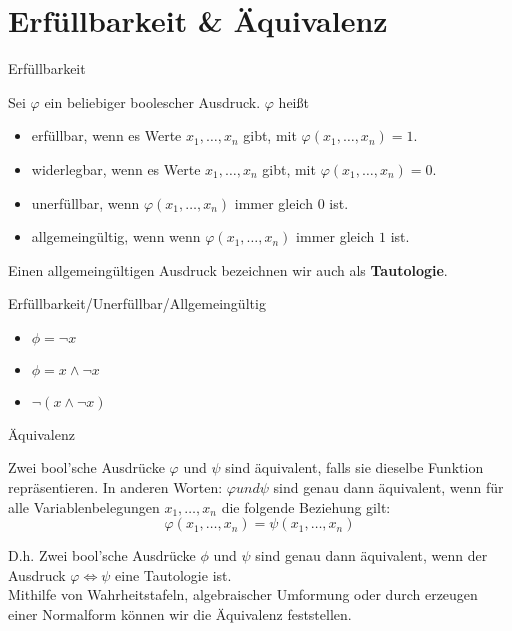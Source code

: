 \documentclass[12pt%
,aspectratio=169%
]{beamer}
\begin{document}
\section{Erfüllbarkeit \& Äquivalenz}
\begin{frame}{Erfüllbarkeit}
	\begin{definition}[Erfüllbarkeit]
		Sei $\varphi$ ein beliebiger boolescher Ausdruck. $\varphi$ heißt
		\begin{itemize}
			\item erfüllbar, wenn es Werte $x_1, \ldots, x_n$ gibt, mit $\varphi (x_1, \ldots, x_n ) = 1$.
			\item widerlegbar, wenn es Werte $x_1, \ldots, x_n$ gibt, mit $\varphi (x_1, \ldots, x_n) = 0$.
			\item unerfüllbar, wenn $\varphi (x_1 ,\ldots , x_n )$ immer gleich $0$ ist.
			\item allgemeingültig, wenn wenn $\varphi (x_1 ,\ldots , x_n )$ immer gleich $1$ ist.
		\end{itemize}
		Einen allgemeingültigen Ausdruck bezeichnen wir auch als \textbf{Tautologie}.
	\end{definition}
\end{frame}

\begin{frame}{Erfüllbarkeit/Unerfüllbar/Allgemeingültig}
\begin{itemize}
	\item $\phi = \neg x$
	\item $\phi = x \land \neg x$
	\item $\neg (x \land \neg x)$
\end{itemize}
\end{frame}

\begin{frame}{Äquivalenz}
\begin{definition}[Äquivalenz]
Zwei bool'sche Ausdrücke $\varphi$ und $\psi$ sind äquivalent, falls sie dieselbe Funktion repräsentieren. In anderen Worten: $\varphi und \psi$ sind genau dann äquivalent, wenn für alle Variablenbelegungen $x_1 , \ldots, x_n$ die folgende Beziehung gilt:
$$ \varphi (x_1,\ldots, x_n) = \psi(x_1, \ldots, x_n)$$
\end{definition}
D.h. Zwei bool'sche Ausdrücke $\phi$ und $\psi$ sind genau dann äquivalent, wenn der Ausdruck $\varphi \Leftrightarrow \psi$ eine Tautologie ist.\\
Mithilfe von Wahrheitstafeln, algebraischer Umformung oder durch erzeugen einer Normalform können wir die Äquivalenz feststellen.
\end{frame}
\end{document}

